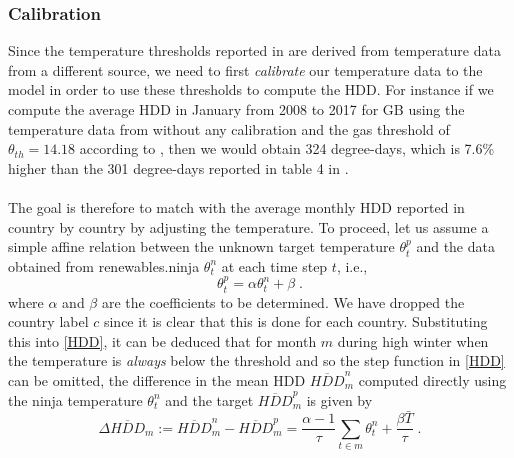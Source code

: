 \documentclass[12pt]{article}
\def\be{\begin{equation}}
\def\ee{\end{equation}}
\begin{document}
\subsubsection*{Calibration}
Since the temperature thresholds reported in \cite{KOZARCANIN2019368} are derived from temperature data from a different source, we need to first \textit{calibrate} our temperature data to the model in order to use these thresholds to compute the HDD. For instance if we compute the average HDD in January from 2008 to 2017 for GB using the temperature data from \cite{ninja} without any calibration and the gas threshold of $\theta_{th}=14.18$ according to \cite{KOZARCANIN2019368}, then we would obtain 324 degree-days, which is 7.6\% higher than the 301 degree-days reported in table 4 in \cite{KOZARCANIN2019368}.\\
\\
The goal is therefore to match with the average monthly HDD reported in \cite{KOZARCANIN2019368} country by country by adjusting the temperature. To proceed, let us assume a simple affine relation between the unknown target temperature $\theta^p_t$ and the data obtained from renewables.ninja  $\theta^n_t$ at each time step $t$, i.e., 
\be 
\theta^p_t = \alpha \theta^n_t + \beta \;.  \label{temp_adj}
\ee
where $\alpha$ and $\beta$ are the coefficients to be determined. We have dropped the country label $c$ since it is clear that this is done for each country. Substituting this into \eqref{HDD}, it can be deduced that for month $m$ during high winter when the temperature is \textit{always} below the threshold and so the step function in \eqref{HDD} can be omitted, the difference in the mean HDD $\overline{HDD}^n_m$ computed directly using the ninja temperature $\theta^n_t$  and the target $\overline{HDD}_m^p$ is given by
\be 
\Delta \overline{HDD}_m:= \overline{HDD}^n_m - \overline{HDD}^p_m = \frac{\alpha -1}{\tau} \sum_{t\in m} \theta^n_t  + \frac{\beta \bar{T}}{\tau} \; . 
\label{temp_linear_regression}
\ee
\end{document}
